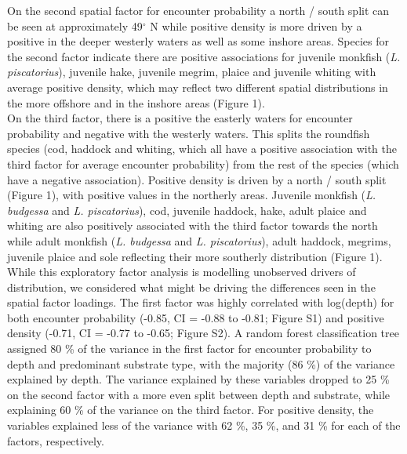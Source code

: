 \documentclass[fleqn,10pt]{wlscirep}
\begin{document}
\begin{linenumbers}
On the second spatial factor for  encounter probability a
north / south split can be seen at approximately 49$^{\circ}$ N while positive
density is more driven by a positive  in
the deeper westerly waters as well as some inshore areas. Species
 for the second factor indicate there are
positive associations for juvenile monkfish (\emph{L.  piscatorius}), juvenile
hake, juvenile megrim, plaice and juvenile whiting with average positive
density, which may reflect two different spatial distributions in the more
offshore and in the inshore areas (Figure 1).\\

On the third factor, there is a positive  the easterly waters for encounter probability
and negative  with the westerly waters. This splits
the roundfish species (cod, haddock and whiting, which all have a positive
association with the third factor for average encounter probability) from the
rest of the species (which have a negative association). Positive density is
driven by a north / south split (Figure 1), with positive
 values in the northerly areas. Juvenile monkfish
(\emph{L.  budgessa} and \emph{L.  piscatorius}), cod, juvenile haddock, hake,
adult plaice and whiting are also positively associated with the third factor
towards the north while adult monkfish (\emph{L. budgessa} and \emph{L.
	piscatorius}), adult haddock, megrims, juvenile plaice and sole
 reflecting
their more southerly distribution (Figure 1).\\

While this exploratory factor analysis is modelling unobserved drivers of
distribution, we considered what might be driving the differences seen in the
spatial factor  loadings. The first
factor was highly correlated with log(depth) for both 
encounter probability  (-0.85, CI = -0.88 to -0.81;
Figure S1) and  positive density
 (-0.71, CI = -0.77 to -0.65; Figure S2). A random
forest classification tree assigned 80 \% of the variance in the first factor
for  encounter probability to depth and predominant
substrate type, with the majority (86 \%) of the variance explained by depth.
The variance explained by these variables dropped to 25 \% on the second factor
with a more even split between depth and substrate, while explaining 60 \% of
the variance on the third factor.  For  positive density,
the variables explained less of the variance with 62 \%, 35 \%, and 31 \% for
each of the factors, respectively.\\


\end{linenumbers}
\end{document}
